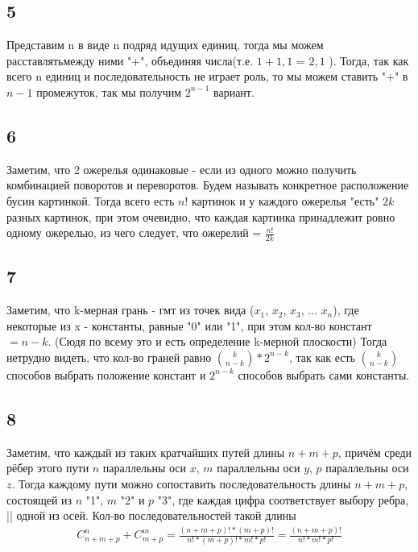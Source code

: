 		\subsection{5}
		Представим n в виде n подряд идущих единиц, тогда мы можем расставлятьмежду ними "+", объединяя числа(т.е. $1+1, 1$ = $2, 1$ ). Тогда, так как всего n единиц и последовательность не играет роль, то мы можем ставить "+" в $n-1$ промежуток, так мы получим $2^{n-1}$ вариант.
		
		\subsection{6}
		Заметим, что 2 ожерелья одинаковые - если из одного можно получить комбинацией поворотов и переворотов. Будем называть конкретное расположение бусин картинкой. Тогда всего есть $n!$ картинок и у каждого ожерелья "есть" $2k$ разных картинок, при этом очевидно, что каждая картинка принадлежит ровно одному ожерелью, из чего следует, что ожерелий = $\frac{n!}{2k}$
		
		\newpage
		\subsection{7}
		Заметим, что k-мерная грань - гмт из точек вида ($x_1$, $x_2$, $x_3$, ... $x_n$), где некоторые из x - константы, равные "0" или "1", при этом кол-во констант $= n - k$. (Сюдя по всему это и есть определение k-мерной плоскости) %
		Тогда нетрудно видеть, что кол-во граней равно ${k \choose {n-k}} *2^{n-k}$, так как есть $k \choose {n-k}$ способов выбрать положение констант и $2^{n-k}$ способов выбрать сами константы.
		
		\subsection{8}
		Заметим, что каждый из таких кратчайших путей длины $n + m + p$, причём среди рёбер этого пути $n$ параллельны оси $x$, $m$ параллельны оси $y$, $p$ параллельны оси $z$. Тогда каждому пути можно сопоставить последовательность длины $n + m + p$, состоящей из $n$ "1", $m$ "2" и $p$ "3", где каждая цифра соответствует выбору ребра, || одной из осей. Кол-во последовательностей такой длины 
		\begin{gather*}
		C_{n + m + p}^n + C_{m + p}^m = \frac{(n+m+p)! * (m+p)!}{n!*(m+p)!*m!*p!} = \frac{(n+m+p)!}{n!*m!*p!}
		\end{gather*}
		
